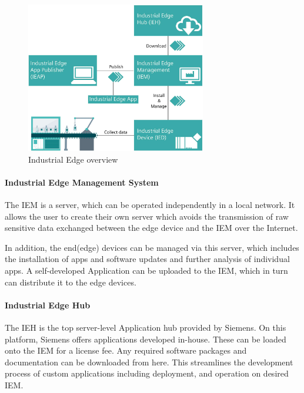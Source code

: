 		\begin{figure}[h]
			\centering
			\includegraphics[width=0.70\textwidth]{"Bilder/Edge_uebersicht.jpg"}
			\caption{Industrial Edge overview \cite{siemensIEM_gettingStarted}}
			\label{fig:Grundlagen:IndustrialEdge:Ueberblick}					
		\end{figure}
	
			
		\paragraph{Industrial Edge Management System}
			The \gls{IEM} is a server, which can be operated independently in a local network. It allows the user to create their own server which avoids the transmission of raw sensitive data exchanged between the edge device and the IEM over the Internet.

			In addition, the end(edge) devices can be managed via this server, which includes the installation of apps and software updates and further analysis of individual apps. A self-developed Application can be uploaded to the IEM, which in turn can distribute it to the edge devices.\cite{siemensIndustrialEdge}

		\paragraph{Industrial Edge Hub}
			The \gls{IEH} 
			is the top server-level Application hub provided by Siemens. On this platform, Siemens offers applications developed in-house. These can be loaded onto the IEM for a license fee. Any required software packages and documentation can be downloaded from here. This streamlines the development process of custom applications including deployment, and operation on desired IEM.\cite{siemensIndustrialEdge}
